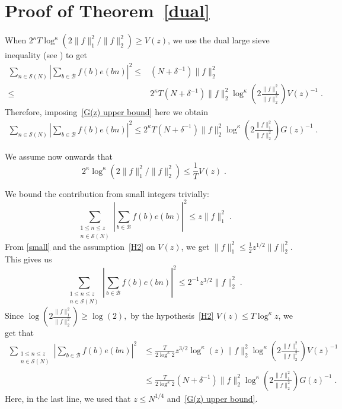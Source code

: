\documentclass[12pt,article]{amsart}
\theoremstyle{remark}
\numberwithin{equation}{section}
\begin{document}
	\section{Proof of Theorem~\ref{dual}}\label{pthm1.3}
	
	When $2^\kappa T\log^{\kappa}\left(2\|f\|_1^2/\|f\|_2^2\right)\geq V(z)$, we use the dual large sieve inequality (see \cite{Montgomery}) to get 
	\begin{align*}
		\sum_{n\in \mathcal{S}(N)}\left|\sum_{b\in \mathcal{B}}f(b)e(bn)\right|^2\leq& (N+\delta^{-1})\|f\|_2^{2}\\
		\leq & 2^\kappa T(N+\delta^{-1})\|f\|_2^{2}\log^{\kappa}\left(2\frac{\|f\|_1^2}{\|f\|_2^2}\right) V(z)^{-1}\; .
	\end{align*}
	Therefore, imposing~\eqref{G(z) upper bound} here we obtain
	\begin{align}\label{case 1}
		\sum_{n\in \mathcal{S}(N)}\left|\sum_{b\in \mathcal{B}}f(b)e(bn)\right|^2
		\leq2^\kappa T(N+\delta^{-1})\|f\|_2^{2}\log^{\kappa}\left(2\frac{\|f\|_1^2}{\|f\|_2^2}\right) G(z)^{-1}\; .
	\end{align}
	
	\noindent
	We assume now onwards that 
	\begin{equation}
		\label{small}
		2^\kappa \log^{\kappa}\left(2\|f\|_1^2/\|f\|_2^2\right)\leq \frac{1}{T}V(z)\;.
	\end{equation}
	
	\noindent
	We bound the contribution from small integers trivially:
	\[
	\sum_{\substack{1\leq n\leq z\\ n\in \mathcal{S}(N)}}\left|\sum_{b\in \mathcal{B}}f(b)e(bn)\right|^2\leq z \|f\|_1^2\; .
	\]
	From \eqref{small} and the assumption~\eqref{H2} on $V(z)$, we get $\|f\|_1^2\leq \frac{1}{2}z^{1/2}\|f\|_2^2$. This gives us 
	\[
	\sum_{\substack{1\leq n\leq z\\ n\in \mathcal{S}(N)}}\left|\sum_{b\in \mathcal{B}}f(b)e(bn)\right|^2\leq 2^{-1}z^{3/2}\|f\|_2^2\; .
	\]
	Since $\log\left(2\frac{\|f\|_1^2}{\|f\|_2^2}\right)\geq \log(2),$ by the hypothesis~\eqref{H2} $V(z)\leq T\log^\kappa z$, we get that 
	\begin{align}
		\label{small-n}
		\sum_{\substack{1\leq n\leq z\\ n\in \mathcal{S}(N)}}\left|\sum_{b\in \mathcal{B}}f(b)e(bn)\right|^2&\leq\frac{T}{2\log^\kappa 2} z^{3/2} \log^\kappa(z)\|f\|_2^2\log^\kappa\left(2\frac{\|f\|_1^2}{\|f\|_2^2}\right) V(z)^{-1}\nonumber\\
		&\leq\frac{T}{2\log^\kappa 2} \left(N+\delta^{-1}\right)\|f\|_2^2\log^\kappa\left(2\frac{\|f\|_1^2}{\|f\|_2^2}\right) G(z)^{-1}\; .
	\end{align}
	Here, in the last line, we used that $z\leq N^{1/4}$ and~\eqref{G(z) upper bound}.
	
\end{document}
